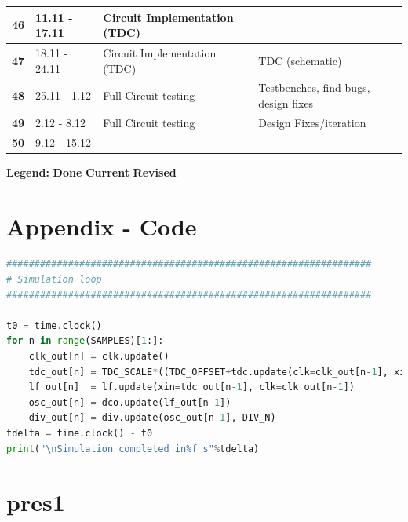 \documentclass[10pt,a4paper]{article}
\begin{document}
\begin{table}
\begin{tabular}{|l|l|l|l|}
			\hline 
			\rule[-1ex]{0pt}{2.5ex} \textbf{46}& 11.11 - 17.11& Circuit Implementation (TDC)& \\ 
			\hline 
			\rule[-1ex]{0pt}{2.5ex} \textbf{47}& 18.11 - 24.11& Circuit Implementation (TDC)& TDC (schematic)\\ 
			\hline 
			\rule[-1ex]{0pt}{2.5ex} \textbf{48}& 25.11 - 1.12& Full Circuit testing & Testbenches, find bugs, design fixes\\ 
			\hline 
			\rule[-1ex]{0pt}{2.5ex} \textbf{49}& 2.12 - 8.12& Full Circuit testing& Design Fixes/iteration\\ 
			\hline 
			\rule[-1ex]{0pt}{2.5ex} \textbf{50}& 9.12 - 15.12& --& --\\ 
			\hline 
		\end{tabular}
		\begin{flushleft}\textbf{Legend:} \colorbox{red!20}{\textbf{Done}} \colorbox{green!20}{\textbf{Current}}  \colorbox{blue!20}{\textbf{Revised}}
		\end{flushleft}
	\end{table}  

	\section{Appendix - Code}


    \begin{lstlisting}[language={Python}, caption={excode}, label={Blabla}]
#################################################################
# Simulation loop
#################################################################

t0 = time.clock()
for n in range(SAMPLES)[1:]:
    clk_out[n] = clk.update()
    tdc_out[n] = TDC_SCALE*((TDC_OFFSET+tdc.update(clk=clk_out[n-1], xin=div_out[n-1]))%TDC_STEPS)
    lf_out[n]  = lf.update(xin=tdc_out[n-1], clk=clk_out[n-1])
    osc_out[n] = dco.update(lf_out[n-1])
    div_out[n] = div.update(osc_out[n-1], DIV_N)
tdelta = time.clock() - t0
print("\nSimulation completed in%f s"%tdelta)
    \end{lstlisting}













	\FloatBarrier
	\section{pres1}
\end{document}
